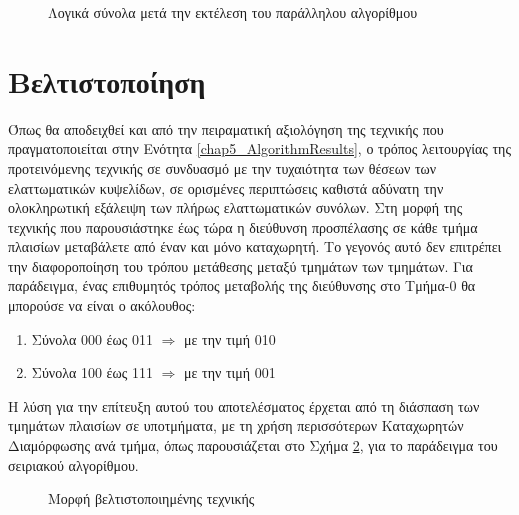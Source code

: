 \begin{figure}[h]
    \centering
    \caption{Λογικά σύνολα μετά την εκτέλεση του παράλληλου αλγορίθμου}
    \label{fig:chap5_parallel_final}
\end{figure}


\section{Βελτιστοποίηση}
\label{chap5_ImprovedMethod}

Όπως θα αποδειχθεί και από την πειραματική αξιολόγηση της τεχνικής που πραγματοποιείται στην Ενότητα \ref{chap5_AlgorithmResults}, ο τρόπος λειτουργίας της προτεινόμενης τεχνικής σε συνδυασμό με την τυχαιότητα των θέσεων των ελαττωματικών κυψελίδων, σε ορισμένες περιπτώσεις καθιστά αδύνατη την ολοκληρωτική εξάλειψη των πλήρως ελαττωματικών συνόλων. Στη μορφή της τεχνικής που παρουσιάστηκε έως τώρα η διεύθυνση προσπέλασης σε κάθε τμήμα πλαισίων μεταβάλετε από έναν και μόνο καταχωρητή. Το γεγονός αυτό δεν επιτρέπει την διαφοροποίηση του τρόπου μετάθεσης μεταξύ τμημάτων των τμημάτων. Για παράδειγμα, ένας επιθυμητός τρόπος μεταβολής της διεύθυνσης στο Τμήμα-0 θα μπορούσε να είναι ο ακόλουθος:
\begin{enumerate}[itemsep=0.5pt]
    \item Σύνολα 000 έως 011 $\Longrightarrow$ \xor με την τιμή 010
    \item Σύνολα 100 έως 111 $\Longrightarrow$ \xor με την τιμή 001
\end{enumerate}

Η λύση για την επίτευξη αυτού του αποτελέσματος έρχεται από τη διάσπαση των τμημάτων πλαισίων σε υποτμήματα, με τη χρήση περισσότερων Καταχωρητών Διαμόρφωσης ανά τμήμα, όπως παρουσιάζεται στο Σχήμα \ref{fig:chap5_multiCR_init}, για το παράδειγμα του σειριακού αλγορίθμου.

\begin{figure}[!t]
    \centering
    \caption{Μορφή βελτιστοποιημένης τεχνικής}
    \label{fig:chap5_multiCR_init}
\end{figure}

